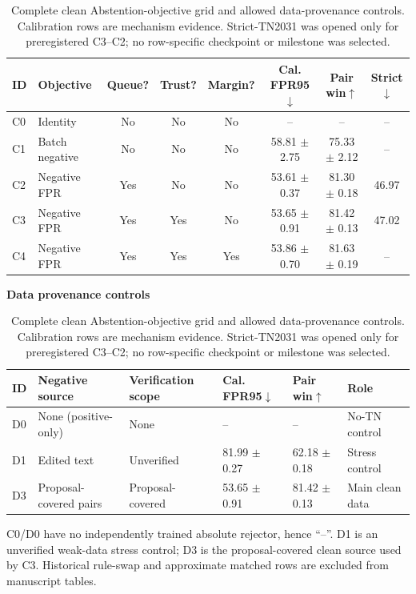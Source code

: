 \begin{table}[t]
\centering
\caption{Complete clean Abstention-objective grid and allowed data-provenance controls. Calibration rows are mechanism evidence. Strict-TN2031 was opened only for preregistered C3--C2; no row-specific checkpoint or milestone was selected.}
\label{tab:supp-rejection-grid}
\scriptsize
\setlength{\tabcolsep}{2.3pt}
\begin{tabular}{llcccccc}\toprule
ID & Objective & Queue? & Trust? & Margin? & Cal. FPR95$\downarrow$ & Pair win$\uparrow$ & Strict$\downarrow$\\\midrule
C0 & Identity & No & No & No & -- & -- & -- \\
C1 & Batch negative & No & No & No & 58.81 $\pm$ 2.75 & 75.33 $\pm$ 2.12 & -- \\
C2 & Negative FPR & Yes & No & No & 53.61 $\pm$ 0.37 & 81.30 $\pm$ 0.18 & 46.97 \\
C3 & Negative FPR & Yes & Yes & No & 53.65 $\pm$ 0.91 & 81.42 $\pm$ 0.13 & 47.02 \\
C4 & Negative FPR & Yes & Yes & Yes & 53.86 $\pm$ 0.70 & 81.63 $\pm$ 0.19 & -- \\
\bottomrule\end{tabular}
\vspace{4pt}

\textbf{Data provenance controls}\par\smallskip
\begin{tabular}{llllll}\toprule
ID & Negative source & Verification scope & Cal. FPR95$\downarrow$ & Pair win$\uparrow$ & Role\\\midrule
D0 & None (positive-only) & None & -- & -- & No-TN control \\
D1 & Edited text & Unverified & 81.99 $\pm$ 0.27 & 62.18 $\pm$ 0.18 & Stress control \\
D3 & Proposal-covered pairs & Proposal-covered & 53.65 $\pm$ 0.91 & 81.42 $\pm$ 0.13 & Main clean data \\
\bottomrule\end{tabular}
\parbox{0.97\textwidth}{\scriptsize C0/D0 have no independently trained absolute rejector, hence ``--''. D1 is an unverified weak-data stress control; D3 is the proposal-covered clean source used by C3. Historical rule-swap and approximate matched rows are excluded from manuscript tables.}
\end{table}

